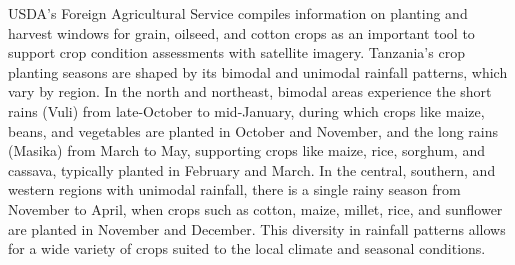 \documentclass[journal]{IEEEtran}
\begin{document}
USDA’s Foreign Agricultural Service compiles information on planting and harvest windows for grain, oilseed, and cotton crops as an important tool to support crop condition assessments with satellite imagery. Tanzania’s crop planting seasons are shaped by its bimodal and unimodal rainfall patterns, which vary by region. In the north and northeast, bimodal areas experience the short rains (Vuli) from late-October to mid-January, during which crops like maize, beans, and vegetables are planted in October and November, and the long rains (Masika) from March to May, supporting crops like maize, rice, sorghum, and cassava, typically planted in February and March. In the central, southern, and western regions with unimodal rainfall, there is a single rainy season from November to April, when crops such as cotton, maize, millet, rice, and sunflower are planted in November and December. This diversity in rainfall patterns allows for a wide variety of crops suited to the local climate and seasonal conditions.
\end{document}

